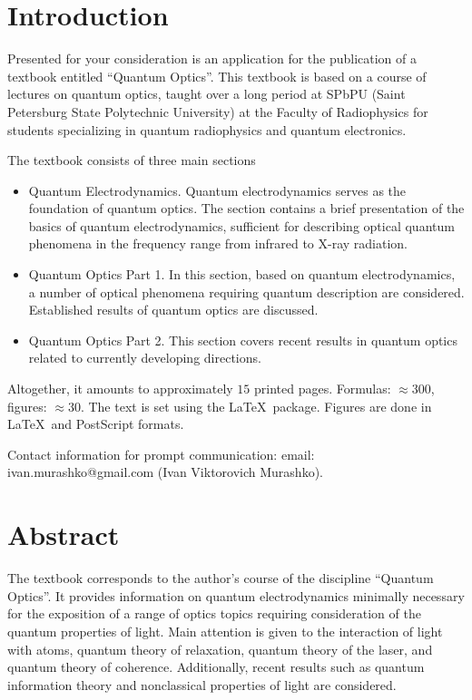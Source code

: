 


\Russian
\pagestyle{empty}


\section*{Introduction}
Presented for your consideration is an application for the publication of a textbook entitled ``Quantum Optics''. This textbook is based on a course of lectures on quantum optics, taught over a long period at SPbPU (Saint Petersburg State Polytechnic University) at the Faculty of Radiophysics for students specializing in quantum radiophysics and quantum electronics.

The textbook consists of three main sections
\begin{itemize}
\item Quantum Electrodynamics. Quantum electrodynamics serves as
  the foundation of quantum optics. The section contains a brief presentation of the basics of quantum electrodynamics,
sufficient for describing optical quantum phenomena in the frequency range from infrared to X-ray radiation.
\item Quantum Optics Part 1. In this section, based on quantum electrodynamics,
  a number of optical phenomena requiring quantum description are considered.
Established results of quantum optics are discussed.
\item Quantum Optics Part 2. This section covers recent results
  in quantum optics related to currently developing directions.
\end{itemize}
Altogether, it amounts to approximately \(15\) printed pages. Formulas: \(\approx 300\), figures: \(\approx 30\). The text is set using the \LaTeX\ package. Figures are done in \LaTeX\ and PostScript formats.

Contact information for prompt communication: email:
ivan.murashko@gmail.com (Ivan Viktorovich Murashko). 

\newpage

\section{Abstract}
The textbook corresponds to the author's course of the discipline ``Quantum Optics''. It provides information on quantum electrodynamics
minimally necessary for the exposition of a range of optics topics requiring consideration of the quantum properties of light. Main attention is given to
the interaction of light with atoms, quantum theory of relaxation,
quantum theory of the laser, and quantum theory of coherence. Additionally,
recent results such as quantum information theory and nonclassical properties of light are considered.

